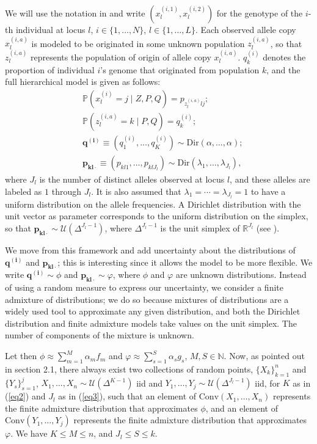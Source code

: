 \documentclass[12pt, reqno]{amsart}
\theoremstyle{definition}
\begin{document}
We will use the notation in  \cite{Pritchard945} and write $(x_l^{(i,1)},x_l^{(i,2)} )$ for the genotype of the $i$-th individual at locus $l$, $i \in \{1,\ldots,N \}$, $l \in \{ 1,\ldots,L \}$. Each observed allele copy $x_l^{(i,a)}$ is modeled to be originated in some unknown population $z_l^{(i,a)}$, so that $z_l^{(i,a)}$ represents the population of origin of allele copy $x_l^{(i,a)}$. $q_k^{(i)}$ denotes the proportion of individual $i$'s genome that originated from population $k$, and the full hierarchical model is given as follows:
\begin{align}
&\mathbb{P}\left(x_l^{(i)}=j \mid Z,P,Q \right)=p_{z_l^{(i,a)}lj} \text{;} \nonumber \\
&\mathbb{P}\left( z_l^{(i,a)}=k \mid P,Q\right)=q_k^{(i)} \text{;} \nonumber \\
&\mathbf{q^{(i)}} \equiv \left( q^{(i)}_1,\ldots,q^{(i)}_K \right) \sim \text{Dir}(\alpha,\ldots,\alpha) \text{;} \label{eq2}\\
&\mathbf{p_{kl\cdot}} \equiv \left( p_{kl1},\ldots,p_{klJ_l} \right) \sim \text{Dir}(\lambda_1,\ldots,\lambda_{J_l}) \label{eq3}\text{,}
\end{align}
where $J_l$ is the number of distinct alleles observed at locus $l$, and these alleles are labeled as $1$ through $J_l$. It is also assumed that $\lambda_1= \cdots = \lambda_{J_l}=1$ to have a uniform distribution on the allele frequencies. A Dirichlet distribution with the unit vector as parameter corresponds to the uniform distribution on the simplex, so that $\mathbf{p_{kl\cdot}} \sim \mathcal{U}(\Delta^{J_l-1})$, where $\Delta^{J_l-1}$ is the unit simplex of $\mathbb{R}^{J_l}$ (see \cite{Frigyik2010IntroductionTT}).

We move from this framework and add uncertainty about the distributions of $\mathbf{q^{(i)}}$ and $\mathbf{p_{kl\cdot}}$; this is interesting since it allows the model to be more flexible. We write $\mathbf{q^{(i)}} \sim \phi$ and $\mathbf{p_{kl\cdot}} \sim \varphi$, where $\phi$ and $\varphi$ are unknown distributions. Instead of using a random measure to express our uncertainty, we consider a finite admixture of distributions; we do so because mixtures of distributions are a widely used tool to approximate any given distribution, and both the Dirichlet distribution and finite admixture models take values on the unit simplex. The number of components of the mixture is unknown.

Let then $\phi \approx \sum_{m=1}^M \alpha_m f_m$ and $\varphi \approx \sum_{s=1}^S \alpha_s g_s$, $M,S \in \mathbb{N}$. Now, as pointed out in section 2.1, there always exist two collections of random points, $\{ X_k \}_{k=1}^n$ and $\{ Y_s \}_{s=1}^j$, $X_1,\ldots,X_n \sim \mathcal{U}(\Delta^{K-1})$ iid and $Y_1,\ldots,Y_j \sim \mathcal{U}(\Delta^{J_l-1})$ iid, for $K$ as in (\ref{eq2}) and $J_l$ as in (\ref{eq3}), such that an element of $\text{Conv}(X_1,\ldots,X_n)$ represents the finite admixture distribution that approximates $\phi$, and an element of $\text{Conv}(Y_1,\ldots,Y_j)$ represents the finite admixture distribution that approximates $\varphi$. We have $K \leq M \leq n$, and $J_l \leq S \leq k$.
\end{document}
